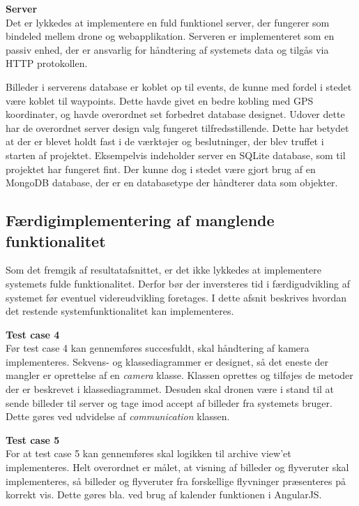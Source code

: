 \newpage

\textbf{Server}\\
Det er lykkedes at implementere en fuld funktionel server, der fungerer som bindeled mellem drone og webapplikation. Serveren er implementeret som en passiv enhed, der er ansvarlig for håndtering af systemets data og tilgås via HTTP protokollen. 

Billeder i serverens database er koblet op til events, de kunne med fordel i stedet være koblet til waypoints. Dette havde givet en bedre kobling med GPS koordinater, og havde overordnet set forbedret database designet. 
Udover dette har de overordnet server design valg fungeret tilfredsstillende. Dette har betydet at der er blevet holdt fast i de værktøjer og beslutninger, der blev truffet i starten af projektet. Eksempelvis indeholder server en SQLite database, som til projektet har fungeret fint. Der kunne dog i stedet være gjort brug af en MongoDB database, der er en databasetype der håndterer data som objekter.

\vspace{0.5cm}

\subsection{Færdigimplementering af manglende funktionalitet}

Som det fremgik af resultatafsnittet, er det ikke lykkedes at implementere systemets fulde funktionalitet. Derfor bør der inversteres tid i færdigudvikling af systemet før eventuel videreudvikling foretages. I dette afsnit beskrives hvordan det restende systemfunktionalitet kan implementeres. 

\textbf{Test case 4}  \\
Før test case 4 kan gennemføres succesfuldt, skal håndtering af kamera implementeres.
Sekvens- og klassediagrammer er designet, så det eneste der mangler er oprettelse af en \textit{camera} klasse. Klassen oprettes og tilføjes de metoder der er beskrevet i klassediagrammet. Desuden skal dronen være i stand til at sende billeder til server og tage imod accept af billeder fra systemets bruger. Dette gøres ved udvidelse af \textit{communication} klassen. 

\textbf{Test case 5} \\
For at test case 5 kan gennemføres skal logikken til archive view'et implementeres. 
Helt overordnet er målet, at visning af billeder og flyveruter skal implementeres, så billeder og flyveruter fra forskellige flyvninger præsenteres på korrekt vis. Dette gøres bla. ved brug af kalender funktionen i AngularJS. 

